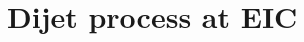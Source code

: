 \documentclass[12pt]{article}
\numberwithin{equation}{section}
\numberwithin{table}{section}
\numberwithin{figure}{section}
\begin{document}


%
\section{Dijet process at EIC}
\label{Dijet process at EIC}
%
\end{document}

